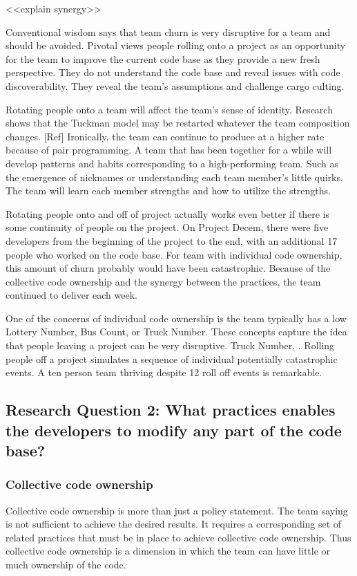 <<explain synergy>>

Conventional wisdom says that team churn is very disruptive for a team and should be avoided. 
Pivotal views people rolling onto a project as an opportunity for the team to improve the current code base as they provide a new fresh perspective. They do not understand the code base and  reveal issues with code discoverability. They reveal the team's assumptions and challenge cargo culting. 

Rotating people onto a team will affect the team's sense of identity. Research shows that the Tuckman model may be restarted whatever the team composition changes. [Ref] Ironically, the team can continue to produce at a higher rate because of pair programming. A team that has been together for a while will develop patterns and habits corresponding to a high-performing team. Such as the emergence of nicknames or understanding each team member's little quirks. The team will learn each member strengths and how to utilize the strengths. 

Rotating people onto and off of project actually works even better if there is some continuity of people on the project.  On Project Decem, there were five developers from the beginning of the project to the end, with an additional 17 people who worked on the code base. For team with individual code ownership, this amount of churn probably would have been catastrophic. Because of the collective code ownership and the synergy between the practices, the team continued to deliver each week.

One of the concerns of individual code ownership is the team typically has a low Lottery Number, Bus Count, or Truck Number. These concepts capture the idea that people leaving a project can be very disruptive. Truck Number,  \cite{WikiTruckNumber}. Rolling people off a project simulates a sequence of individual potentially catastrophic events.  A ten person team thriving despite 12 roll off events is remarkable. 

\subsection{Research Question 2: What practices enables the developers to modify any part of the code base?}
\subsubsection{Collective code ownership}
Collective code ownership is more than just a policy statement. The team saying  is not sufficient to achieve the desired results. It requires a corresponding set of related practices that must be in place to achieve collective code ownership. Thus collective code ownership is a dimension in which the team can have little or much ownership of the code. 

